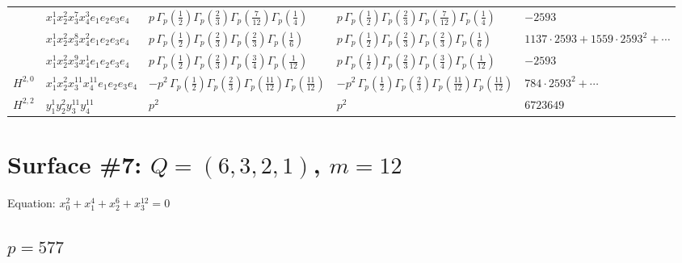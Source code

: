 \documentclass[11pt]{article}
\begin{document}
\begin{table}[ht]
{\begin{tabular}{@{}lllll@{}}
 & $x_{1}^{1} x_{2}^{2} x_{3}^{7} x_{4}^{3}  e_{1} e_{2} e_{3} e_{4}$ & $p \, \Gamma_p \left( \frac{1}{2} \right) \Gamma_p \left( \frac{2}{3} \right) \Gamma_p \left( \frac{7}{12} \right) \Gamma_p \left( \frac{1}{4} \right)$ & $p \, \Gamma_p \left( \frac{1}{2} \right) \Gamma_p \left( \frac{2}{3} \right) \Gamma_p \left( \frac{7}{12} \right) \Gamma_p \left( \frac{1}{4} \right)$ & $-2593$ \\
 & $x_{1}^{1} x_{2}^{2} x_{3}^{8} x_{4}^{2}  e_{1} e_{2} e_{3} e_{4}$ & $p \, \Gamma_p \left( \frac{1}{2} \right) \Gamma_p \left( \frac{2}{3} \right) \Gamma_p \left( \frac{2}{3} \right) \Gamma_p \left( \frac{1}{6} \right)$ & $p \, \Gamma_p \left( \frac{1}{2} \right) \Gamma_p \left( \frac{2}{3} \right) \Gamma_p \left( \frac{2}{3} \right) \Gamma_p \left( \frac{1}{6} \right)$ & $1137{\cdot}2593{+}1559{\cdot}2593^{2}{+}\cdots$ \\
 & $x_{1}^{1} x_{2}^{2} x_{3}^{9} x_{4}^{1}  e_{1} e_{2} e_{3} e_{4}$ & $p \, \Gamma_p \left( \frac{1}{2} \right) \Gamma_p \left( \frac{2}{3} \right) \Gamma_p \left( \frac{3}{4} \right) \Gamma_p \left( \frac{1}{12} \right)$ & $p \, \Gamma_p \left( \frac{1}{2} \right) \Gamma_p \left( \frac{2}{3} \right) \Gamma_p \left( \frac{3}{4} \right) \Gamma_p \left( \frac{1}{12} \right)$ & $-2593$ \\
\midrule
$H^{2,0}$ & $x_{1}^{1} x_{2}^{2} x_{3}^{11} x_{4}^{11}  e_{1} e_{2} e_{3} e_{4}$ & $- p^{2} \, \Gamma_p \left( \frac{1}{2} \right) \Gamma_p \left( \frac{2}{3} \right) \Gamma_p \left( \frac{11}{12} \right) \Gamma_p \left( \frac{11}{12} \right)$ & $- p^{2} \, \Gamma_p \left( \frac{1}{2} \right) \Gamma_p \left( \frac{2}{3} \right) \Gamma_p \left( \frac{11}{12} \right) \Gamma_p \left( \frac{11}{12} \right)$ & $784{\cdot}2593^{2}{+}\cdots$ \\
\midrule
$H^{2,2}$ & $y_{1}^{1} y_{2}^{2} y_{3}^{11} y_{4}^{11}$ & $p^{2} \,$ & $p^{2} \,$ & $6723649$ \\
\bottomrule
\end{tabular}
}
\renewcommand{\arraystretch}{1.0}
\end{table}

\newpage

\section*{Surface \#7: $Q=(6, 3, 2, 1)$, $m=12$}

Equation: $x_0^{2} + x_1^{4} + x_2^{6} + x_3^{12} = 0$

\subsection*{$p = 577$}
\end{document}
